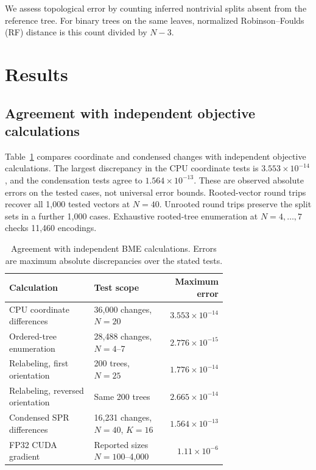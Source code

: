 \documentclass[11pt,a4paper]{article}
\makeatletter
\DeclareRobustCommand{\_}{\ifmmode\nfss@text{\textunderscore}\else\textunderscore\allowbreak\fi}
\theoremstyle{definition}
\makeatother
\begin{document}
We assess topological error by counting inferred nontrivial splits absent from the reference tree.
For binary trees on the same leaves, normalized Robinson--Foulds (RF) distance is this count divided by $N-3$.

\section{Results}
\label{sec:results}

\subsection{Agreement with independent objective calculations}
\label{sec:validation_results}

Table~\ref{tab:validation} compares coordinate and condensed changes with independent objective calculations.
The largest discrepancy in the CPU coordinate tests is $3.553\times10^{-14}$, and the condensation tests agree to $1.564\times10^{-13}$.
These are observed absolute errors on the tested cases, not universal error bounds.
Rooted-vector round trips recover all 1,000 tested vectors at $N=40$.
Unrooted round trips preserve the split sets in a further 1,000 cases.
Exhaustive rooted-tree enumeration at $N=4,\ldots,7$ checks 11,460 encodings.

\begin{table}[tb]
\centering
\caption{Agreement with independent BME calculations. Errors are maximum absolute discrepancies over the stated tests.}
\label{tab:validation}
\small
\begin{tabular}{@{}p{0.39\linewidth}p{0.32\linewidth}r@{}}
\toprule
Calculation & Test scope & Maximum error\\
\midrule
CPU coordinate differences & 36,000 changes, $N=20$ & $3.553\times10^{-14}$\\
Ordered-tree enumeration & 28,488 changes, $N=4$--7 & $2.776\times10^{-15}$\\
Relabeling, first orientation & 200 trees, $N=25$ & $1.776\times10^{-14}$\\
Relabeling, reversed orientation & Same 200 trees & $2.665\times10^{-14}$\\
Condensed SPR differences & 16,231 changes, $N=40$, $K=16$ & $1.564\times10^{-13}$\\
FP32 CUDA gradient & Reported sizes $N=100$--4,000 & $1.11\times10^{-6}$\\
\bottomrule
\end{tabular}
\end{table}
\end{document}
